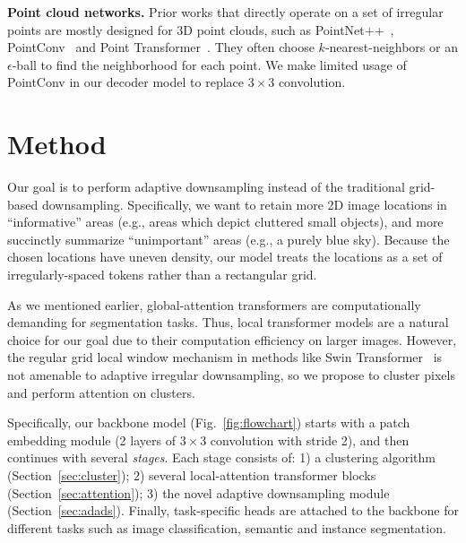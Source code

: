\documentclass[10pt,twocolumn,letterpaper]{article}
\begin{document}
\noindent\textbf{Point cloud networks.} Prior works that directly operate on a set of irregular points are mostly designed for 3D point clouds, such as PointNet++~\cite{pointnet++}, PointConv~\cite{pointconv} and Point Transformer~\cite{pointtransformer}. They often choose $k$-nearest-neighbors or an $\epsilon$-ball to find the neighborhood for each point. We make limited usage of PointConv in our decoder model to replace $3 \times 3$ convolution. %
 













\section{Method}\label{sec:method}
Our goal is to perform adaptive downsampling instead of the traditional grid-based downsampling. Specifically, we want to retain more 2D image locations in  ``informative'' areas (e.g., areas which depict cluttered small objects), and more succinctly summarize ``unimportant'' areas (e.g., a purely blue sky). Because the chosen locations  have uneven density, our model treats the locations as a set of irregularly-spaced tokens rather than a rectangular grid. 


As we mentioned earlier, global-attention transformers are computationally demanding for segmentation tasks. Thus, local transformer models are a natural choice for our goal due to their computation efficiency on larger images.  However, the regular grid local window mechanism in methods like Swin Transformer~\cite{swin} is not amenable to adaptive irregular downsampling, so we propose to cluster pixels and perform attention on clusters.


Specifically, our backbone model (Fig.~\ref{fig:flowchart}) starts with a patch embedding module (2 layers of $3\times 3$ convolution with stride 2), and then continues with several \textit{stages}. Each stage consists of: 1) a clustering algorithm (Section~\ref{sec:cluster}); 2) several local-attention transformer blocks (Section~\ref{sec:attention}); 3) the novel adaptive downsampling module (Section~\ref{sec:adads}).  Finally, task-specific heads are attached to the backbone for different tasks such as image classification, semantic and instance segmentation.
\end{document}
